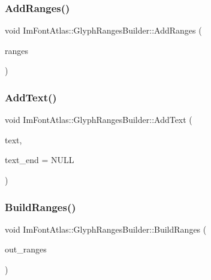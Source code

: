 \subsubsection{\texorpdfstring{Add\+Ranges()}{AddRanges()}}
{\footnotesize\ttfamily void Im\+Font\+Atlas\+::\+Glyph\+Ranges\+Builder\+::\+Add\+Ranges (\begin{DoxyParamCaption}\item[{const Im\+Wchar $\ast$}]{ranges }\end{DoxyParamCaption})}

\hypertarget{struct_im_font_atlas_1_1_glyph_ranges_builder_a6c0f9756dc8ea184920d5ff28bfdb669}{}\label{struct_im_font_atlas_1_1_glyph_ranges_builder_a6c0f9756dc8ea184920d5ff28bfdb669} 
\subsubsection{\texorpdfstring{Add\+Text()}{AddText()}}
{\footnotesize\ttfamily void Im\+Font\+Atlas\+::\+Glyph\+Ranges\+Builder\+::\+Add\+Text (\begin{DoxyParamCaption}\item[{const char $\ast$}]{text,  }\item[{const char $\ast$}]{text\+\_\+end = {\ttfamily NULL} }\end{DoxyParamCaption})}

\hypertarget{struct_im_font_atlas_1_1_glyph_ranges_builder_aa55b5710971adef2e4c690a3e46de6d5}{}\label{struct_im_font_atlas_1_1_glyph_ranges_builder_aa55b5710971adef2e4c690a3e46de6d5} 
\subsubsection{\texorpdfstring{Build\+Ranges()}{BuildRanges()}}
{\footnotesize\ttfamily void Im\+Font\+Atlas\+::\+Glyph\+Ranges\+Builder\+::\+Build\+Ranges (\begin{DoxyParamCaption}\item[{\hyperlink{class_im_vector}{Im\+Vector}$<$ Im\+Wchar $>$ $\ast$}]{out\+\_\+ranges }\end{DoxyParamCaption})}

